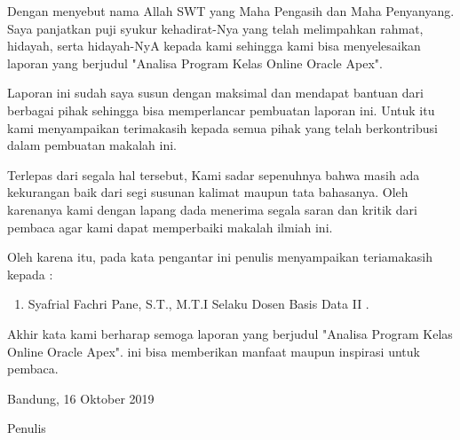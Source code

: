 \begin{acknowledgements}
Dengan menyebut nama Allah SWT yang Maha Pengasih dan Maha Penyanyang. Saya panjatkan puji syukur kehadirat-Nya yang telah melimpahkan rahmat, hidayah, serta hidayah-NyA kepada kami sehingga kami bisa menyelesaikan laporan yang berjudul "Analisa Program Kelas Online Oracle Apex".

Laporan ini sudah saya susun dengan maksimal dan mendapat bantuan dari berbagai pihak sehingga bisa memperlancar pembuatan laporan ini. Untuk itu kami menyampaikan terimakasih kepada semua pihak yang telah berkontribusi dalam pembuatan makalah ini.

Terlepas dari segala hal tersebut, Kami sadar sepenuhnya bahwa masih ada kekurangan baik dari segi susunan kalimat maupun tata bahasanya. Oleh karenanya kami dengan lapang dada menerima segala saran dan kritik dari pembaca agar kami dapat memperbaiki makalah ilmiah ini.



Oleh karena itu, pada kata pengantar ini penulis menyampaikan teriamakasih kepada :
\begin{enumerate}

\item  Syafrial Fachri Pane, S.T., M.T.I Selaku Dosen Basis Data II .
\end{enumerate}

Akhir kata kami berharap semoga laporan yang berjudul "Analisa Program Kelas Online Oracle Apex". ini bisa memberikan manfaat maupun inspirasi untuk pembaca.

\begin{raggedleft}

Bandung, 16 Oktober 2019

Penulis

\end{raggedleft}

\end{acknowledgements}
